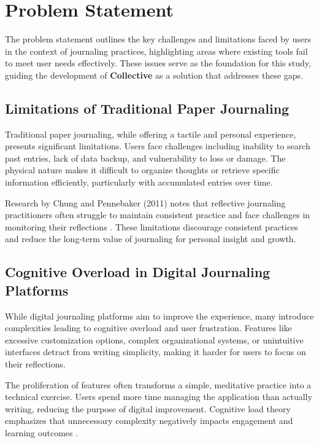 \section{Problem Statement}\label{sec:problem}

The problem statement outlines the key challenges and limitations faced by users in the context of journaling practices, highlighting areas where existing tools fail to meet user needs effectively. These issues serve as the foundation for this study, guiding the development of \textbf{Collective} as a solution that addresses these gaps.

\subsection{Limitations of Traditional Paper Journaling}\label{subsec:traditional-limits}

Traditional paper journaling, while offering a tactile and personal experience, presents significant limitations. Users face challenges including inability to search past entries, lack of data backup, and vulnerability to loss or damage. The physical nature makes it difficult to organize thoughts or retrieve specific information efficiently, particularly with accumulated entries over time.

Research by Chung and Pennebaker (2011) notes that reflective journaling practitioners often struggle to maintain consistent practice and face challenges in monitoring their reflections \cite{chung2011expressive}. These limitations discourage consistent practices and reduce the long-term value of journaling for personal insight and growth.

\subsection{Cognitive Overload in Digital Journaling Platforms}\label{subsec:cognitive-overload}

While digital journaling platforms aim to improve the experience, many introduce complexities leading to cognitive overload and user frustration. Features like excessive customization options, complex organizational systems, or unintuitive interfaces detract from writing simplicity, making it harder for users to focus on their reflections.

The proliferation of features often transforms a simple, meditative practice into a technical exercise. Users spend more time managing the application than actually writing, reducing the purpose of digital improvement. Cognitive load theory emphasizes that unnecessary complexity negatively impacts engagement and learning outcomes \cite{sloan2015efficacy}.

